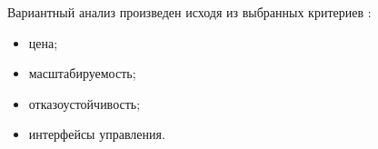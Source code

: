 Вариантный анализ произведен исходя из выбранных критериев \cite{var-analyz}:
\begin{itemize}
  \item цена;
  \item масштабируемость;
  \item отказоустойчивость;
  \item интерфейсы управления.
\end{itemize}

\clearpage

